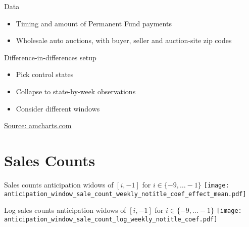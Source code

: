 \documentclass[aspectratio=169]{beamer}
\begin{document}
\begin{frame}{Data}
	\begin{itemize}
		\item Timing and amount of Permanent Fund payments
		\item Wholesale auto auctions, with buyer, seller and auction-site zip codes
	\end{itemize}

\end{frame}

\begin{frame}{Difference-in-differences setup}
	\begin{itemize}
		\item Pick control states
		\item Collapse to state-by-week observations
		\item Consider different windows
	\end{itemize}

\end{frame}
{
\begin{frame}[plain]
	\vspace*{8cm}
	\hspace*{11cm}
	\href{https://www.amcharts.com/visited_states/}{\footnotesize Source: amcharts.com}
\end{frame}
}

\section{Sales Counts}

\begin{frame}{Sales counts anticipation widows of $[i, -1]$ for $i \in \{-9, \ldots -1\}$}
	\centering
	\texttt{[image: anticipation\_window\_sale\_count\_weekly\_notitle\_coef\_effect\_mean.pdf]}
\end{frame}

\begin{frame}{Log sales counts anticipation widows of $[i, -1]$ for $i \in \{-9, \ldots -1\}$}
	\centering
	\texttt{[image: anticipation\_window\_sale\_count\_log\_weekly\_notitle\_coef.pdf]}
\end{frame}
\end{document}
